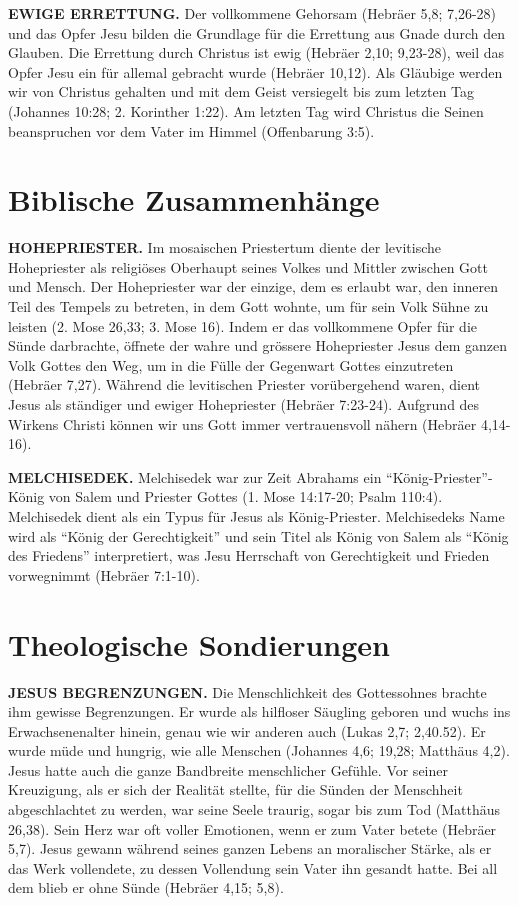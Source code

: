 \documentclass[headsepline=true]{book}
\begin{document}
\textbf{EWIGE ERRETTUNG.} Der vollkommene Gehorsam (Hebräer 5,8;
7,26-28) und das Opfer Jesu bilden die Grundlage für die Errettung aus
Gnade durch den Glauben. Die Errettung durch Christus ist ewig (Hebräer
2,10; 9,23-28), weil das Opfer Jesu ein für allemal gebracht wurde
(Hebräer 10,12). Als Gläubige werden wir von Christus gehalten und mit
dem Geist versiegelt bis zum letzten Tag (Johannes 10:28; 2. Korinther
1:22). Am letzten Tag wird Christus die Seinen beanspruchen vor dem
Vater im Himmel (Offenbarung 3:5).

\section{Biblische Zusammenhänge}\label{biblische-zusammenhuxe4nge-3}

\textbf{HOHEPRIESTER.} Im mosaischen Priestertum diente der levitische
Hohepriester als religiöses Oberhaupt seines Volkes und Mittler zwischen
Gott und Mensch. Der Hohepriester war der einzige, dem es erlaubt war,
den inneren Teil des Tempels zu betreten, in dem Gott wohnte, um für
sein Volk Sühne zu leisten (2. Mose 26,33; 3. Mose 16). Indem er das
vollkommene Opfer für die Sünde darbrachte, öffnete der wahre und
grössere Hohepriester Jesus dem ganzen Volk Gottes den Weg, um in die
Fülle der Gegenwart Gottes einzutreten (Hebräer 7,27). Während die
levitischen Priester vorübergehend waren, dient Jesus als ständiger und
ewiger Hohepriester (Hebräer 7:23-24). Aufgrund des Wirkens Christi
können wir uns Gott immer vertrauensvoll nähern (Hebräer 4,14-16).

\textbf{MELCHISEDEK.} Melchisedek war zur Zeit Abrahams ein
``König-Priester''-König von Salem und Priester Gottes (1. Mose
14:17-20; Psalm 110:4). Melchisedek dient als ein Typus für Jesus als
König-Priester. Melchisedeks Name wird als ``König der Gerechtigkeit''
und sein Titel als König von Salem als ``König des Friedens''
interpretiert, was Jesu Herrschaft von Gerechtigkeit und Frieden
vorwegnimmt (Hebräer 7:1-10).

\section{Theologische Sondierungen}\label{theologische-sondierungen-1}

\textbf{JESUS BEGRENZUNGEN.} Die Menschlichkeit des Gottessohnes brachte
ihm gewisse Begrenzungen. Er wurde als hilfloser Säugling geboren und
wuchs ins Erwachsenenalter hinein, genau wie wir anderen auch (Lukas
2,7; 2,40.52). Er wurde müde und hungrig, wie alle Menschen (Johannes
4,6; 19,28; Matthäus 4,2). Jesus hatte auch die ganze Bandbreite
menschlicher Gefühle. Vor seiner Kreuzigung, als er sich der Realität
stellte, für die Sünden der Menschheit abgeschlachtet zu werden, war
seine Seele traurig, sogar bis zum Tod (Matthäus 26,38). Sein Herz war
oft voller Emotionen, wenn er zum Vater betete (Hebräer 5,7). Jesus
gewann während seines ganzen Lebens an moralischer Stärke, als er das
Werk vollendete, zu dessen Vollendung sein Vater ihn gesandt hatte. Bei
all dem blieb er ohne Sünde (Hebräer 4,15; 5,8).
\end{document}
